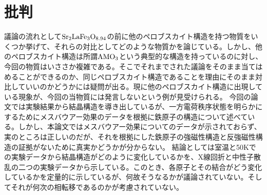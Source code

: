\documentclass{jsarticle}
\begin{document}
\section{批判}
議論の流れとして$\rm{Sr_{2}LaFe_{3}O_{8.94}}$の前に他のペロブスカイト構造を持つ物質をいくつか挙げて、それらの対比としてどのような物質かを論じている。しかし、他のペロブスカイト構造は所謂$\rm{AMO_{3}}$という典型的な構造を持っているのに対し、今回の物質はいささか複雑である。そこでそれまでされた議論をそのまま当てはめることができるのか、同じペロブスカイト構造であることを理由にそのまま対比していいのかどうかには疑問が出る。現に他のペロブスカイト構造に出現している現象が、今回の当物質には発言しないという例が見受けられる。
今回の論文では実験結果から結晶構造を導き出しているが、一方電荷秩序状態を明らかにするためにメスバウアー効果のデータを根拠に鉄原子の構造について述べている。しかし、本論文ではメスバウアー効果についてのデータが示されておらず、実のところは正しいのだが、それを根拠にした鉄原子の強磁性構造と反強磁性構造の証拠がないために真実かどうかが分からない。
結論としては室温と50Kでの実験データから結晶構造がどのように変化しているかを、X線回折と中性子散乱の二つの実験データから示している。このとき、各原子とその結合がどう変化しているかを定量的に示しているが、何故そうなるかが議論されていない。そしてそれが何次の相転移であるのかが考慮されていない。
\end{document}
